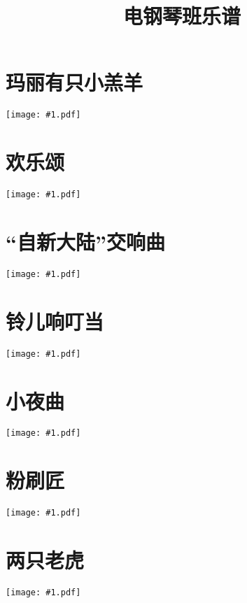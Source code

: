 \documentclass[a4paper,12pt,fontset=none]{ctexart}
\title{\bfseries 电钢琴班乐谱}
\author{}
\date{}
\newcommand{\includescore}[1]{\begin{center}\texttt{[image: \#1.pdf]}\end{center}}
\begin{document}
\pagestyle{plain}

\maketitle

\thispagestyle{plain}

\section{玛丽有只小羔羊}
\includescore{mary-had-a-little-lamb}

\section{欢乐颂}
\includescore{ode-to-joy}

\section{“自新大陆”交响曲}
\includescore{from-the-new-world}

\section{铃儿响叮当}
\includescore{jingle-bells}

\section{小夜曲}
\includescore{serenade}

\section{粉刷匠}
\includescore{painter}

\section{两只老虎}
\includescore{two-tigers}
\end{document}
